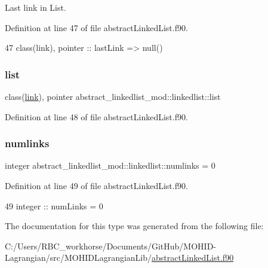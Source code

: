 Last link in List. 



Definition at line 47 of file abstract\+Linked\+List.\+f90.


\begin{DoxyCode}
47         \textcolor{keywordtype}{class}(link), \textcolor{keywordtype}{pointer} :: lastLink => null()    
\end{DoxyCode}
\mbox{\label{structabstract__linkedlist__mod_1_1linkedlist_aa01c4be95b38ef7dd93c4cc550108f1d}} 
\subsubsection{\texorpdfstring{list}{list}}
{\footnotesize\ttfamily class(\mbox{\hyperlink{structlink__mod_1_1link}{link}}), pointer abstract\+\_\+linkedlist\+\_\+mod\+::linkedlist\+::list\hspace{0.3cm}{\ttfamily [private]}}



Definition at line 48 of file abstract\+Linked\+List.\+f90.

\mbox{\label{structabstract__linkedlist__mod_1_1linkedlist_a943157fc98cf02c94ed8fb50379a5e62}} 
\subsubsection{\texorpdfstring{numlinks}{numlinks}}
{\footnotesize\ttfamily integer abstract\+\_\+linkedlist\+\_\+mod\+::linkedlist\+::numlinks = 0\hspace{0.3cm}{\ttfamily [private]}}



Definition at line 49 of file abstract\+Linked\+List.\+f90.


\begin{DoxyCode}
49         \textcolor{keywordtype}{integer} :: numLinks = 0
\end{DoxyCode}


The documentation for this type was generated from the following file\+:\begin{DoxyCompactItemize}
\item 
C\+:/\+Users/\+R\+B\+C\+\_\+workhorse/\+Documents/\+Git\+Hub/\+M\+O\+H\+I\+D-\/\+Lagrangian/src/\+M\+O\+H\+I\+D\+Lagrangian\+Lib/\mbox{\hyperlink{abstract_linked_list_8f90}{abstract\+Linked\+List.\+f90}}\end{DoxyCompactItemize}
